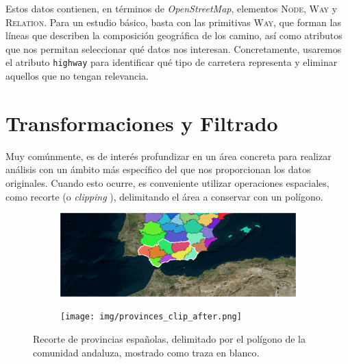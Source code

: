	Estos datos contienen, en términos de \textit{OpenStreetMap}, elementos \textsc{Node}, \textsc{Way} y \textsc{Relation}. Para un estudio básico, basta con las primitivas \textsc{Way}, que forman las líneas que describen la composición geográfica de los camino, así como atributos que nos permitan seleccionar qué datos nos interesan. Concretamente, usaremos el atributo \texttt{highway} para identificar qué tipo de carretera representa y eliminar aquellos que no tengan relevancia.

\section{Transformaciones y Filtrado}
	
	Muy comúnmente, es de interés profundizar en un área concreta para realizar análisis con un ámbito más específico del que nos proporcionan los datos originales. Cuando esto ocurre, es conveniente utilizar operaciones espaciales, como recorte (o \textit{clipping} \autocite[354--355]{bolstad}), delimitando el área a conservar con un polígono. 
	
	\begin{figure}[htbp]
		\begin{subfigure}{0.5\textwidth}
			\centering
			\includegraphics[width=.95\textwidth]{img/provinces_clip_before.png}
		\end{subfigure}
		\begin{subfigure}{0.5\textwidth}
			\centering
			\texttt{[image: img/provinces\_clip\_after.png]}
		\end{subfigure}
		\caption[Operación de recorte sobre datos geográficos]{Recorte de provincias españolas, delimitado por el polígono de la comunidad andaluza, mostrado como traza en blanco.}
	\end{figure}
	
